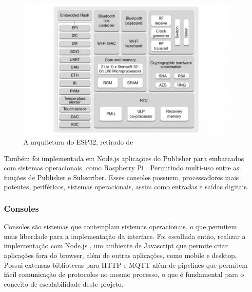 \begin{figure}[h!]
\centering
\includegraphics[width=13cm]{./02_Capitulos/02_Cap3/figures/espressif32-arch}
\caption{A arquitetura do ESP32, retirado de \cite{espressif}}
\label{fig:3.3.4/esp32-arch}
\end{figure}


Também foi implementada em Node.js \cite{nodejs} aplicações do Publisher para embarcados com sistemas operacionais, como Raspberry Pi \cite{raspberry-pi}. Permitindo multi-uso entre as funções de Publisher e Subscriber. Esses consoles possuem, processadores mais potentes, periféricos, sistemas operacionais, assim como entradas e saídas digitais.


\subsubsection{Consoles}
\label{subsubsection:consoles}

Consoles são sistemas que contemplam sistemas operacionais, o que permitem mais liberdade para a implementação da interface. Foi escolhida então, realizar a implementação com Node.js , um ambiente de Javascript que permite criar aplicações fora do browser, além de outras aplicações, como mobile e desktop. Possui extensas bibliotecas para HTTP e MQTT além de pipelines que permitem fácil comunicação de protocolos no mesmo processo, o que é fundamental para o conceito de escalabilidade deste projeto.


